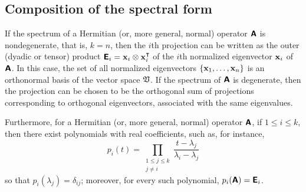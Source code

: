 \subsection{Composition of the spectral form}

If the spectrum of a  Hermitian (or, more general, normal) operator $\textsf{\textbf{A}}$ is nondegenerate, that is, $k=n$, then the
$i$th projection
can be written as the outer (dyadic or tensor) product
$
\textsf{\textbf{E}}_i={\bf x}_i \otimes {\bf x}_i^\intercal $
of the $i$th normalized eigenvector ${\bf x}_i $ of $\textsf{\textbf{A}}$.
In this case, the set of all normalized eigenvectors $\{{\bf x}_1, \ldots ,{\bf x}_n\}$ is an orthonormal basis of the vector space $\frak V$.
If the spectrum of $\textsf{\textbf{A}}$ is degenerate, then the projection can be chosen to be the orthogonal sum of projections
corresponding to orthogonal eigenvectors, associated with the same  eigenvalues.

Furthermore, for a  Hermitian (or, more general, normal) operator $\textsf{\textbf{A}}$,
if $1\le i \le k$,
then there exist polynomials with real coefficients, such as,  for instance,
\begin{equation}
p_i  (t)
=
\prod_{
\begin{array}{c}
1\le j\le k\\
j\neq i
\end{array}
}
\frac{t-\lambda_j}{\lambda_i -\lambda_j}
\label{2011-m-epsf}
\end{equation}
so that
$p_i(\lambda_j) =\delta_{ij}$;
moreover, for every such polynomial,
$p_i(\textsf{\textbf{A}})=\textsf{\textbf{E}}_i$.

